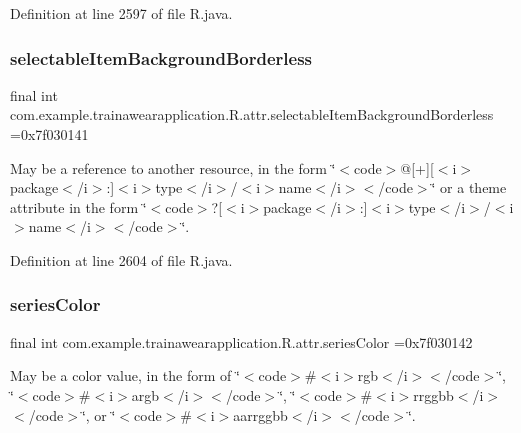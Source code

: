 Definition at line 2597 of file R.\+java.

\mbox{\label{classcom_1_1example_1_1trainawearapplication_1_1_r_1_1attr_a14ae67cda4335ccc08b7e2f3c11e8247}} 
\subsubsection{\texorpdfstring{selectableItemBackgroundBorderless}{selectableItemBackgroundBorderless}}
{\footnotesize\ttfamily final int com.\+example.\+trainawearapplication.\+R.\+attr.\+selectable\+Item\+Background\+Borderless =0x7f030141\hspace{0.3cm}{\ttfamily [static]}}

May be a reference to another resource, in the form \char`\"{}$<$code$>$@\mbox{[}+\mbox{]}\mbox{[}$<$i$>$package$<$/i$>$\+:\mbox{]}$<$i$>$type$<$/i$>$/$<$i$>$name$<$/i$>$$<$/code$>$\char`\"{} or a theme attribute in the form \char`\"{}$<$code$>$?\mbox{[}$<$i$>$package$<$/i$>$\+:\mbox{]}$<$i$>$type$<$/i$>$/$<$i$>$name$<$/i$>$$<$/code$>$\char`\"{}. 

Definition at line 2604 of file R.\+java.

\mbox{\label{classcom_1_1example_1_1trainawearapplication_1_1_r_1_1attr_afd61c562031d13f64b319ab485a383a3}} 
\subsubsection{\texorpdfstring{seriesColor}{seriesColor}}
{\footnotesize\ttfamily final int com.\+example.\+trainawearapplication.\+R.\+attr.\+series\+Color =0x7f030142\hspace{0.3cm}{\ttfamily [static]}}

May be a color value, in the form of \char`\"{}$<$code$>$\#$<$i$>$rgb$<$/i$>$$<$/code$>$\char`\"{}, \char`\"{}$<$code$>$\#$<$i$>$argb$<$/i$>$$<$/code$>$\char`\"{}, \char`\"{}$<$code$>$\#$<$i$>$rrggbb$<$/i$>$$<$/code$>$\char`\"{}, or \char`\"{}$<$code$>$\#$<$i$>$aarrggbb$<$/i$>$$<$/code$>$\char`\"{}. 

